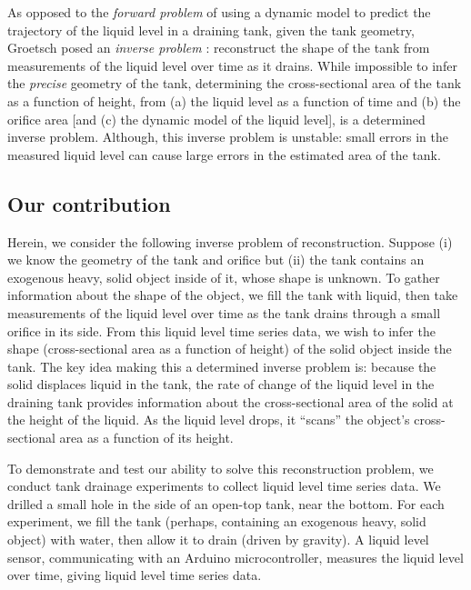 \documentclass[openacc]{rsproca_new}%
\begin{document}
As opposed to the \emph{forward problem} of using a dynamic model to predict the trajectory of the liquid level in a draining tank, given the tank geometry, Groetsch \cite{groetsch1993inverse,groetsch1999inverse} posed an \emph{inverse problem} \cite{groetsch1993inverse,neto2012introduction,tarantola2005inverse}: reconstruct the shape of the tank from measurements of the liquid level over time as it drains. 
While impossible to infer the \emph{precise} geometry of the tank, determining the cross-sectional area of the tank as a function of height, from (a) the liquid level as a function of time and (b) the orifice area [and (c) the dynamic model of the liquid level], is a determined inverse problem. Although, this inverse problem is unstable: small errors in the measured liquid level can cause large errors in the estimated area of the tank. \cite{groetsch1993inverse}

\subsection{Our contribution}
Herein, we consider the following inverse problem of reconstruction.
Suppose (i) we know the geometry of the tank and orifice but (ii) the tank contains an exogenous heavy, solid object inside of it, whose shape is unknown.
To gather information about the shape of the object, we fill the tank with liquid, then take measurements of the liquid level over time as the tank drains through a small orifice in its side. 
From this liquid level time series data, we wish
to infer the shape (cross-sectional area as a function of height) of the solid object inside the tank. 
The key idea making this a determined inverse problem is:
because the solid displaces liquid in the tank, the rate of change of the liquid level in the draining tank provides information about the cross-sectional area of the solid at the height of the liquid.
As the liquid level drops, it ``scans'' the object's cross-sectional area as a function of its height.

To demonstrate and test our ability to solve this reconstruction problem, we conduct tank drainage experiments to collect liquid level time series data.
We drilled a small hole in the side of an open-top tank, near the bottom.
For each experiment, we fill the tank (perhaps, containing an exogenous heavy, solid object) with water, then allow it to drain (driven by gravity). A liquid level sensor, communicating with an Arduino microcontroller, measures the liquid level over time, giving liquid level time series data. 
\end{document}
